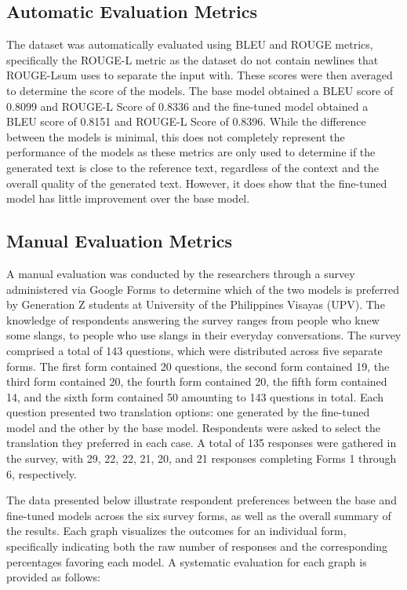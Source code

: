 \subsection{Automatic Evaluation Metrics}
The dataset was automatically evaluated using BLEU and ROUGE metrics, specifically the ROUGE-L metric as the dataset do not contain newlines that ROUGE-Lsum uses to separate the input with. These scores were then averaged to determine the score of the models. The base model obtained a BLEU score of 0.8099 and ROUGE-L Score of 0.8336 and the fine-tuned model obtained a BLEU score of 0.8151 and ROUGE-L Score of 0.8396. While the difference between the models is minimal, this does not completely represent the performance of the models as these metrics are only used to determine if the generated text is close to the reference text, regardless of the context and the overall quality of the generated text. However, it does show that the fine-tuned model has little improvement over the base model.

\subsection{Manual Evaluation Metrics}
A manual evaluation was conducted by the researchers through a survey administered via Google Forms to determine which of the two models is preferred by Generation Z students at University of the Philippines Visayas (UPV). The knowledge of respondents answering the survey ranges from people who knew some slangs, to people who use slangs in their everyday conversations. The survey comprised a total of 143 questions, which were distributed across five separate forms. The first form contained 20 questions, the second form contained 19, the third form contained 20, the fourth form contained 20, the fifth form contained 14, and the sixth form contained 50 amounting to 143 questions in total. Each question presented two translation options: one generated by the fine-tuned model and the other by the base model. Respondents were asked to select the translation they preferred in each case. A total of 135 responses were gathered in the survey, with 29, 22, 22, 21, 20, and 21 responses completing Forms 1 through 6, respectively.

The data presented below illustrate respondent preferences between the base and fine-tuned models across the six survey forms, as well as the overall summary of the results. Each graph visualizes the outcomes for an individual form, specifically indicating both the raw number of responses and the corresponding percentages favoring each model. A systematic evaluation for each graph is provided as follows:


